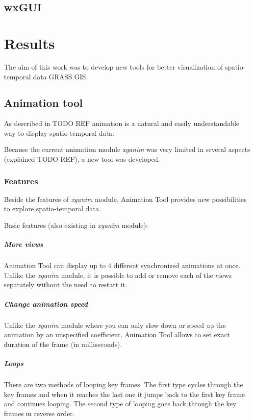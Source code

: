 \documentclass[a4paper,12pt]{book}
\newcommand{\module}[1]{\textsl{#1}}
\newcommand{\at}{Animation Tool\xspace}
\begin{document}

\section{wxGUI}



\chapter{Results}%

The aim of this work was to develop new tools for better visualization of spatio-temporal data GRASS GIS.

\section{Animation tool}
As described in TODO REF animation is a natural and easily understandable way to display spatio-temporal data.

Because the current animation module \module{xganim} was very limited
in several aspects (explained TODO REF), a new tool was developed.

\subsection{Features}
Beside the features of \module{xganim} module, \at provides new possibilities
to explore spatio-temporal data.

Basic features (also existing in \module{xganim} module):
\paragraph{More views}
\at can display up to 4 different synchronized animations at once.
Unlike the \module{xganim} module, it is possible to add or remove each of the views separately
without the need to restart it.
\paragraph{Change animation speed}
Unlike the \module{xganim} module where you can only
slow down or speed up the animation by an unspecified coefficient, \at allows to set
exact duration of the frame (in milliseconds).
\paragraph{Loops}
There are two methods of looping key frames.
The first type cycles through the key frames and when it reaches the last one it jumps back
to the first key frame and continues looping.
The second type of looping goes back through the key frames in reverse order.
\end{document}
